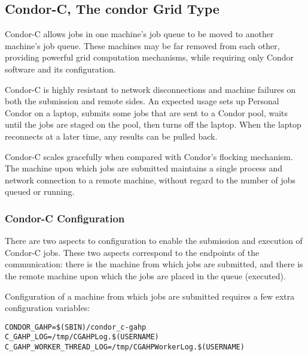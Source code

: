 
\subsection{\label{sec:Condor-C}Condor-C, The condor Grid Type }

Condor-C allows jobs in one machine's job queue to
be moved to another machine's job queue.
These machines may be far removed from each other,
providing powerful grid computation mechanisms,
while requiring only Condor software and its configuration.

Condor-C is highly resistant to network disconnections and machine failures on both the submission and remote sides.
An expected usage
sets up Personal Condor on a laptop,
submits some jobs that are sent to a Condor pool,
waits until the jobs are staged on the pool,
then turns off the laptop.
When the laptop reconnects at a later time,
any results can be pulled back.

Condor-C scales gracefully when compared with Condor's flocking
mechanism.
The machine upon which jobs are submitted
maintains a single process and network connection to a remote machine,
without regard to the number
of jobs queued or running.

\subsubsection{\label{sec:Condor-C-Config}Condor-C Configuration}
There are two aspects to configuration to enable the
submission and execution of Condor-C jobs.
These two aspects correspond to the endpoints of the 
communication: there is the machine from which jobs are
submitted, and there is the remote machine upon which the
jobs are placed in the queue (executed).

Configuration of a machine from which jobs are submitted
requires a few extra configuration variables:

\footnotesize
\begin{verbatim}
CONDOR_GAHP=$(SBIN)/condor_c-gahp
C_GAHP_LOG=/tmp/CGAHPLog.$(USERNAME)
C_GAHP_WORKER_THREAD_LOG=/tmp/CGAHPWorkerLog.$(USERNAME)
\end{verbatim}
\normalsize

